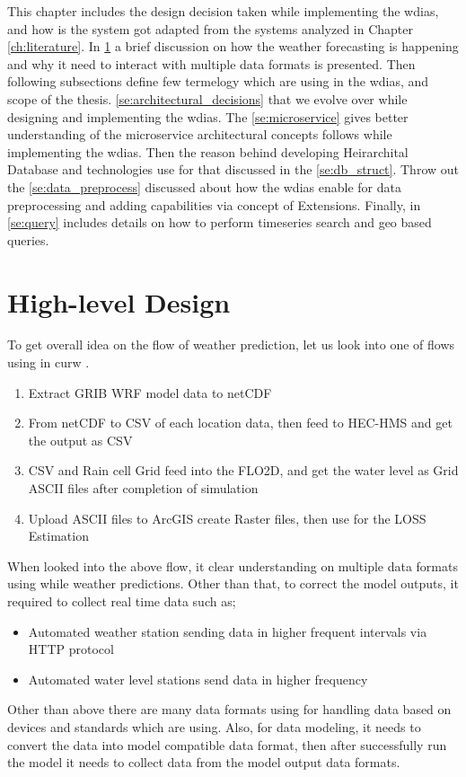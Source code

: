 This chapter includes the design decision taken while implementing the \acrfull{wdias}, and how is the system got adapted from the systems analyzed in Chapter \ref{ch:literature}. %
In \cref{se:high_level_design} a brief discussion on how the weather forecasting is happening and why it need to interact with multiple data formats is presented. Then following subsections define few termelogy which are using in the \acrshort{wdias}, and scope of the thesis.
\cref{se:architectural_decisions} that we evolve over while designing and implementing the \acrshort{wdias}.
The \cref{se:microservice} gives better understanding of the microservice architectural concepts follows while implementing the \acrshort{wdias}.
Then the reason behind developing Heirarchital Database and technologies use for that discussed in the \cref{se:db_struct}.
Throw out the \cref{se:data_preprocess} discussed about how the \acrshort{wdias} enable for data preprocessing and adding capabilities via concept of Extensions.
Finally, in \cref{se:query} includes details on how to perform timeseries search and geo based queries.

\section{High-level Design}
\label{se:high_level_design}

To get overall idea on the flow of weather prediction, let us look into one of flows using in \acrshort{curw} \cite{CUrWSL2017SL}.

\begin{enumerate}
    \item Extract GRIB WRF model data to netCDF
    \item From netCDF to CSV of each location data, then feed to HEC-HMS and get the output as CSV
    \item CSV and Rain cell Grid feed into the FLO2D, and get the water level as Grid ASCII files after completion of simulation
    \item Upload ASCII files to ArcGIS create Raster files, then use for the LOSS Estimation
\end{enumerate}
When looked into the above flow, it clear understanding on multiple data formats using while weather predictions.
Other than that, to correct the model outputs, it required to collect real time data such as;
\begin{itemize}
    \item Automated weather station sending data in higher frequent intervals via HTTP protocol
    \item Automated water level stations send data in higher frequency
\end{itemize}
Other than above there are many data formats using for handling data based on devices and standards which are using. Also, for data modeling, it needs to convert the data into model compatible data format, then after successfully run the model it needs to collect data from the model output data formats.

